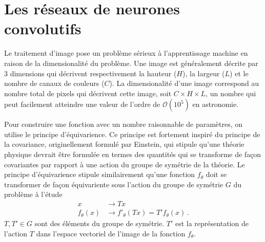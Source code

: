 
\section{Les réseaux de neurones convolutifs}\label{sec:cnn}
Le traitement d'image pose un problème sérieux à l'apprentissage machine en raison de la dimensionalité du problème. 
Une image est généralement décrite par 3 dimensions qui décrivent respectivement la hauteur ($H$), la largeur ($L$) et le nombre de canaux de couleurs ($C$). 
La dimensionalité d'une image correspond au nombre total de pixels qui décrivent cette image, soit $C \times H \times L $, 
un nombre qui peut facilement atteindre une valeur de l'ordre de $\mathcal{O}(10^{5})$ en astronomie.

Pour construire une fonction avec un nombre raisonnable de paramètres, on utilise le principe d'équivarience. 
Ce principe est fortement inspiré du principe de la covariance, originellement formulé 
par Einstein, qui stipule qu'une théorie physique devrait être formulée en termes des quantités qui se transforme de façon covariantes 
par rapport à une action du groupe de symétrie de la théorie. Le principe d'équivarience stipule similairement qu'une fonction $f_\theta$ doit se transformer de façon équivariente
sous l'action du groupe de symétrie $G$ du problème à l'étude
\begin{equation}
        \begin{split}
                x &\rightarrow Tx\\
                f_\theta(x) &\rightarrow f'_\theta(Tx) = T'f_\theta(x) \, .
        \end{split}
\end{equation} 
$T, T' \in G$ sont des éléments du groupe de symétrie. $T'$ est la représentation de l'action $T$ dans l'espace vectoriel de l'image de la fonction $f_\theta$.

